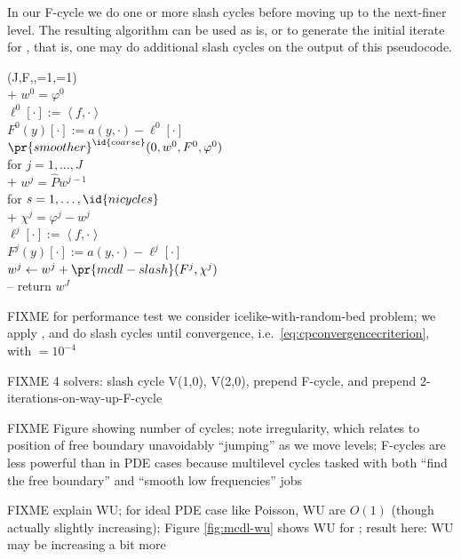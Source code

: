 \documentclass[letterpaper,final,12pt,reqno]{amsart}
\theoremstyle{claim}
\newcommand{\ip}[2]{\left<#1,#2\right>}
\numberwithin{equation}{section}
\numberwithin{figure}{section}
\numberwithin{table}{section}
\numberwithin{theorem}{section}
\begin{document}
In our F-cycle we do one or more slash cycles before moving up to the next-finer level.  The resulting algorithm can be used as is, or to generate the initial iterate for , that is, one may do additional slash cycles on the output of this pseudocode.
\begin{pseudo*} \label{ps:mcdl-fcycle}
(J,F,\varphi,=1,=1)\text{:} \\+
    $w^0=\varphi^0$ \qquad\qquad\qquad\qquad\qquad\quad {} \\
    $\ell^0[\cdot] := \ip{f}{\cdot}$ \\
    $F^0(y)[\cdot] := a(y,\cdot) - \ell^0[\cdot]$ \\
    $\pr{smoother}^{\id{coarse}}(0,w^0,F^0,\varphi^0)$ \\
    for $j=1,\dots,J$ \\+
        $w^j = \hat P w^{j-1}$ \qquad\qquad\qquad\qquad {} \\
        for $s=1,\dots,\id{nicycles}$ \qquad\qquad\qquad {} \\+
            $\chi^j = \varphi^j - w^j$ \\
            $\ell^j[\cdot] := \ip{f}{\cdot}$ \\
            $F^j(y)[\cdot] := a(y,\cdot) - \ell^j[\cdot]$ \\
            $w^j \gets w^j+\pr{mcdl-slash}(F^j,\chi^j)$ \\--
    return $w^J$
\end{pseudo*}


FIXME for performance test we consider icelike-with-random-bed problem; we apply , and do slash cycles until convergence, i.e.~\eqref{eq:cpconvergencecriterion}, with  $=10^{-4}$

FIXME 4 solvers: slash cycle V(1,0), V(2,0), prepend F-cycle, and prepend 2-iterations-on-way-up-F-cycle

FIXME Figure showing number of cycles; note irregularity, which relates to position of free boundary unavoidably ``jumping'' as we move levels; F-cycles are less powerful than in PDE cases because multilevel cycles tasked with both ``find the free boundary'' and ``smooth low frequencies'' jobs

FIXME explain WU; for ideal PDE case like Poisson, WU are $O(1)$ (though actually slightly increasing); Figure \ref{fig:mcdl-wu} shows WU for ; result here: WU may be increasing a bit more
\end{document}
